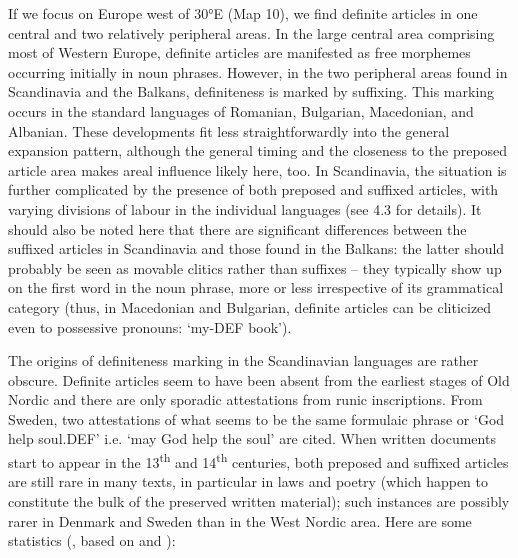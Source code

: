 If we focus on Europe west of 30°E (Map 10), we find definite articles in one central and two relatively peripheral areas. In the large central area comprising most of Western Europe, definite articles are manifested as free morphemes occurring initially in noun phrases. However, in the two peripheral areas found in Scandinavia and the Balkans, definiteness is marked by suffixing.  This marking occurs in the standard languages of Romanian, Bulgarian, Macedonian, and Albanian. These developments fit less straightforwardly into the general expansion pattern, although the general timing and the closeness to the preposed article area makes areal influence likely here, too. In Scandinavia, the situation is further complicated by the presence of both preposed and suffixed articles, with varying divisions of labour in the individual languages (see 4.3 for details). It should also be noted here that there are significant differences between the suffixed articles in Scandinavia and those found in the Balkans: the latter should probably be seen as movable clitics rather than suffixes – they typically show up on the first word in the noun phrase, more or less irrespective of its grammatical category (thus, in Macedonian and Bulgarian, definite articles can be cliticized even to possessive pronouns:  ‘my-DEF book’). 


The origins of definiteness marking in the Scandinavian languages are rather obscure. Definite articles seem to have been absent from the earliest stages of Old Nordic and there are only sporadic attestations from runic inscriptions. From Sweden, two attestations of what seems to be the same formulaic phrase or ‘God help soul.DEF’ i.e. ‘may God help the soul’ are cited. When written documents start to appear in the 13\textsuperscript{th} and 14\textsuperscript{th} centuries, both preposed and suffixed articles are still rare in many texts, in particular in laws and poetry (which happen to constitute the bulk of the preserved written material); such instances are possibly rarer in Denmark and Sweden than in the West Nordic area. Here are some statistics (\citet[938]{Delsing2002}, based on \citet{Larm1936} and \citet{Skautrup1944}): 


